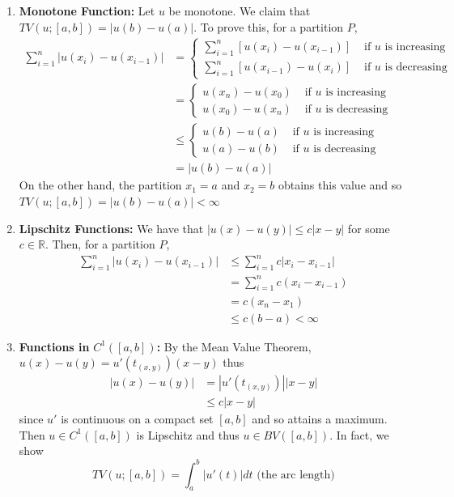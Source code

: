 \documentclass[11pt,a4paper]{article}
\theoremstyle{definition}
\begin{document}
\begin{enumerate}
    \item \textbf{Monotone Function:} Let $u$ be monotone. We claim that $TV(u;[a,b]) = |u(b) - u(a)|$. To prove this, for a partition $P$, 
    \begin{align*}
    \sum \limits _{i=1}^n|u(x_i) - u(x_{i-1})| & = \begin{cases} \sum \limits _{i=1}^n [u(x_i)-u(x_{i-1})]& \text{ if } u \text{ is increasing} \\ \sum \limits _{i=1}^n[u(x_{i-1})-u(x_{i})] & \text{ if } u \text{ is decreasing} \end{cases} \\
    & = \begin{cases} u(x_n) - u(x_0)& \text{ if } u \text{ is increasing} \\ u(x_0) - u(x_n) & \text{ if } u \text{ is decreasing} \end{cases} \\
    & \le \begin{cases}
        u(b) - u(a) & \text{ if } u \text{ is increasing} \\ 
        u(a) - u(b) & \text{ if } u \text{ is decreasing}
    \end{cases} \\
    & = |u(b) - u(a)| 
    \end{align*}
    On the other hand, the partition $x_1 = a$ and $x_2 = b$ obtains this value and so $TV(u; [a,b]) = |u(b) - u(a)| < \infty$

    \item \textbf{Lipschitz Functions:} We have that $|u(x) - u(y)| \le c|x-y|$ for some $c \in \mathbb{R}$. Then, for a partition $P$, 
    \begin{align*}
    \sum \limits _{i=1}^n|u(x_i) - u(x_{i-1})| & \le \sum \limits _{i=1}^n c|x_i - x_{i-1}| \\
    & = \sum \limits _{i=1}^n c(x_i - x_{i-1}) \\
    & = c(x_n - x_1) \\
    & \le c(b-a) < \infty
    \end{align*}

    \item \textbf{Functions in} $C^1([a,b])$\textbf{:}  By the Mean Value Theorem, $u(x) - u(y) = u' (t_{(x,y)})(x-y)$ thus
    \begin{align*}
        |u(x) - u(y)| &= |u' (t_{(x,y)})||x-y| \\
        & \le c|x-y|
    \end{align*}
    since $u'$ is continuous on a compact set $[a,b]$ and so attains a maximum. Then $u \in C^1([a,b])$ is Lipschitz and thus $u \in BV([a,b])$. In fact, we show \[TV(u; [a,b]) = \int _a^b|u'(t)|dt \text{ (the arc length)}\]
    

\end{enumerate}
\end{document}
